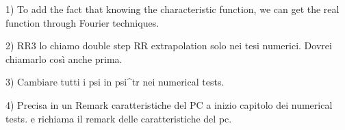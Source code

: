 


1) To add the fact that knowing the characteristic function, we can get the real function through Fourier techniques. 

2) RR3 lo chiamo double step RR extrapolation solo nei tesi numerici. Dovrei chiamarlo così anche prima.

3) Cambiare tutti i psi in psi^tr nei numerical tests.

4) Precisa in un Remark caratteristiche del PC a inizio capitolo dei numerical tests. e richiama il remark delle caratteristiche del pc.

